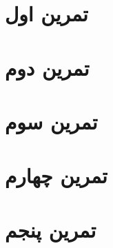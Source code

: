 \def \sems{دی 1401}
\def \Course {
یادگیری ماشین
}
\def \Author{سید مهدی رضوی}


\newpage

\tableofcontents
\listoffigures
\newpage

\section{تمرین اول }


\clearpage

\section{تمرین دوم}


\newpage
\clearpage

\section{تمرین سوم}


\clearpage

\section{تمرین چهارم}


\clearpage

\section{تمرین پنجم}



% 


% 


% 